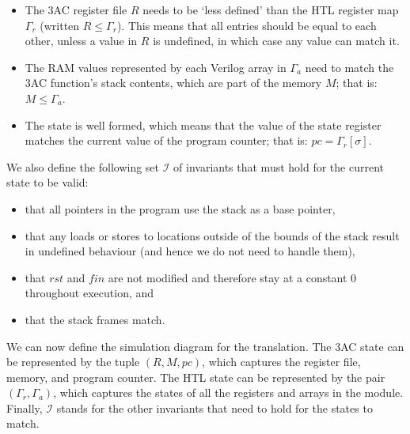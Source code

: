 \begin{itemize}
  \item The 3AC register file $R$ needs to be `less defined' than the HTL register map $\Gamma_{r}$ (written $R \le \Gamma_{r}$). This means that all entries should be equal to each other, unless a value in $R$ is undefined, in which case any value can match it.
  \item The RAM values represented by each Verilog array in $\Gamma_{a}$ need to match the 3AC function's stack contents, which are part of the memory $M$; that is: $M \le \Gamma_{a}$.
  \item The state is well formed, which means that the value of the state register matches the current value of the program counter; that is: $\mathit{pc} = \Gamma_{r}[\sigma]$.
\end{itemize}

We also define the following set $\mathcal{I}$ of invariants that must hold for the current state to be valid:

\begin{itemize}
  \item that all pointers in the program use the stack as a base pointer,
  \item that any loads or stores to locations outside of the bounds of the stack result in undefined behaviour (and hence we do not need to handle them),
  \item that $\mathit{rst}$ and $\mathit{fin}$ are not modified and therefore stay at a constant 0 throughout execution, and
  \item that the stack frames match.
\end{itemize}

We can now define the simulation diagram for the translation. The 3AC state can be represented by the tuple $(R,M,\mathit{pc})$, which captures the register file, memory, and program counter. The HTL state can be represented by the pair $(\Gamma_{r}, \Gamma_{a})$, which captures the states of all the registers and arrays in the module.  Finally, $\mathcal{I}$ stands for the other invariants that need to hold for the states to match.

